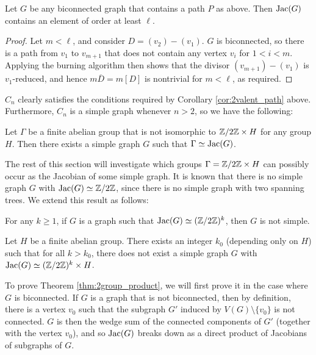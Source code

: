 \documentclass{amsart}
\begin{document}
\begin{cor}
  \label{cor:2valent_path}
  Let $G$ be any biconnected graph that contains a path $P$ as
  above. Then $\operatorname{Jac}(G)$ contains an element of order at least $\ell$.
\end{cor}
\begin{proof}
  Let $m < \ell$, and consider $D = (v_2) - (v_1)$. $G$ is
  biconnected, so there is a path from $v_1$ to $v_{m+1}$ that does
  not contain any vertex $v_i$ for $1 < i < m$. Applying the burning
  algorithm then shows that the divisor $(v_{m+1}) - (v_1)$ is
  $v_1$-reduced, and hence $m\overline{D} = m[D]$ is nontrivial for $m
  < \ell$, as required.
\end{proof}

$C_n$ clearly satisfies the conditions required by Corollary
\ref{cor:2valent_path} above. Furthermore, $C_n$ is a simple graph
whenever $n > 2$, so we have the following:

\begin{cor}
  Let $\Gamma$ be a finite abelian group that is not isomorphic to
  $\mathbb{Z}/2\mathbb{Z} \times H$ for any group $H$. Then there exists a simple
  graph $G$ such that $\Gamma \simeq \operatorname{Jac}(G)$.
\end{cor}

The rest of this section will investigate which groups $\Gamma =
\mathbb{Z}/2\mathbb{Z} \times H$ can possibly occur as the Jacobian of some simple
graph. It is known that there is no simple graph $G$ with $\operatorname{Jac}(G)
\simeq \mathbb{Z}/2\mathbb{Z}$, since there is no simple graph with two spanning
trees. We extend this result as follows:

\begin{thm}
  \label{thm:2group}
  For any $k \ge 1$, if $G$ is a graph such that $\operatorname{Jac}(G) \simeq
  (\mathbb{Z}/2\mathbb{Z})^k$, then $G$ is not simple.
\end{thm}

\begin{thm}
  \label{thm:2group_product}
  Let $H$ be a finite abelian group. There exists an integer $k_0$
  (depending only on $H$) such that for all $k > k_0$, there does not exist
  a simple graph $G$ with $\operatorname{Jac}(G) \simeq (\mathbb{Z}/2\mathbb{Z})^k \times H$.
\end{thm}

To prove Theorem \ref{thm:2group_product}, we will first prove it in
the case where $G$ is biconnected. If $G$ is a graph that is not
biconnected, then by definition, there is a vertex $v_0$ such that the
subgraph $G'$ induced by $V(G) \setminus \{v_0\}$ is not
connected. $G$ is then the wedge sum of the connected components of
$G'$ (together with the vertex $v_0$), and so $\operatorname{Jac}(G)$ breaks down as
a direct product of Jacobians of subgraphs of $G$.
\end{document}
